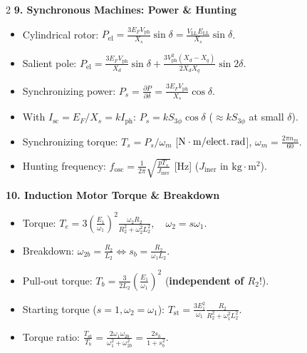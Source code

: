 \begin{multicols}{2}
\textbf{9. Synchronous Machines: Power \& Hunting}
\vspace{-0.3em}
\begin{itemize}\setlength{\itemsep}{0pt}\setlength{\parskip}{0pt}
  \item Cylindrical rotor: $P_{\mathrm{el}} = \frac{3 E_F V_{\mathrm{ph}}}{X_s}\sin\delta = \frac{V_{\mathrm{LL}} E_{\mathrm{LL}}}{X_s}\sin\delta$.
  \item Salient pole: $P_{\mathrm{el}} = \frac{3 E_F V_{\mathrm{ph}}}{X_d}\sin\delta + \frac{3 V_{\mathrm{ph}}^2(X_d - X_q)}{2 X_d X_q}\sin 2\delta$.
  \item Synchronizing power: $P_s = \frac{\partial P}{\partial \delta} = \frac{3 E_F V_{\mathrm{ph}}}{X_s}\cos\delta$.
  \item With $I_{\mathrm{sc}} = E_F/X_s = k I_{\mathrm{ph}}$: $P_s = k S_{3\phi}\cos\delta$ ($\approx k S_{3\phi}$ at small $\delta$).
  \item Synchronizing torque: $T_s = P_s / \omega_m$ [$\mathrm{N\cdot m/\text{elect.\,rad}}$], $\omega_m = \frac{2\pi n_m}{60}$.
  \item Hunting frequency: $f_{\mathrm{osc}} = \frac{1}{2\pi}\sqrt{\frac{p T_s}{J_{\mathrm{iner}}}}$ [$\mathrm{Hz}$] ($J_{\mathrm{iner}}$ in $\mathrm{kg\cdot m^2}$).
\end{itemize}

\textbf{10. Induction Motor Torque \& Breakdown}
\vspace{-0.3em}
\begin{itemize}\setlength{\itemsep}{0pt}\setlength{\parskip}{0pt}
  \item Torque: $T_e = 3\left(\frac{E_1}{\omega_1}\right)^2 \frac{\omega_2 R_2}{R_2^2 + \omega_2^2 L_2^2},\quad \omega_2 = s\omega_1$.
  \item Breakdown: $\omega_{2b} = \frac{R_2}{L_2} \iff s_b = \frac{R_2}{\omega_1 L_2}$.
  \item Pull-out torque: $T_b = \frac{3}{2 L_2}\left(\frac{E_1}{\omega_1}\right)^2$ (\textbf{independent of $R_2$}!).
  \item Starting torque ($s=1, \omega_2=\omega_1$): $T_{\mathrm{st}} = \frac{3 E_1^2}{\omega_1}\frac{R_2}{R_2^2 + \omega_1^2 L_2^2}$.
  \item Torque ratio: $\frac{T_{\mathrm{st}}}{T_b} = \frac{2\omega_1\omega_{2b}}{\omega_1^2 + \omega_{2b}^2} = \frac{2 s_b}{1 + s_b^2}$.
\end{itemize}


\end{multicols}
